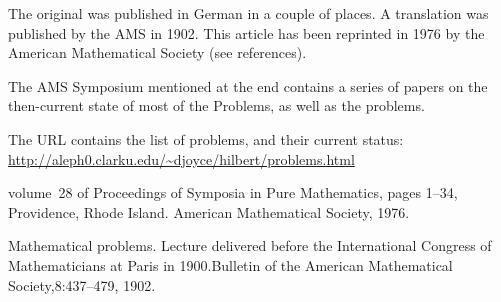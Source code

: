 The original was published in German in a couple of places.  A
translation was published by the AMS in 1902.   
%
%
This article has been
reprinted in 1976 by the American Mathematical Society (see 
references).

The AMS Symposium mentioned at the end contains a series of papers on
the then-current state of most of the Problems, as well as the problems.

The URL contains the list of problems, and their current status:
\url{http://aleph0.clarku.edu/~djoyce/hilbert/problems.html}






    {volume~28 of  Proceedings of Symposia in Pure Mathematics,}
    {pages 1--34, Providence, Rhode Island. American Mathematical
    Society, 1976.}



    {Mathematical problems. Lecture delivered before the International
    Congress of Mathematicians at Paris in 1900.}{Bulletin of the
    American Mathematical Society,}{8:437--479, 1902.}
